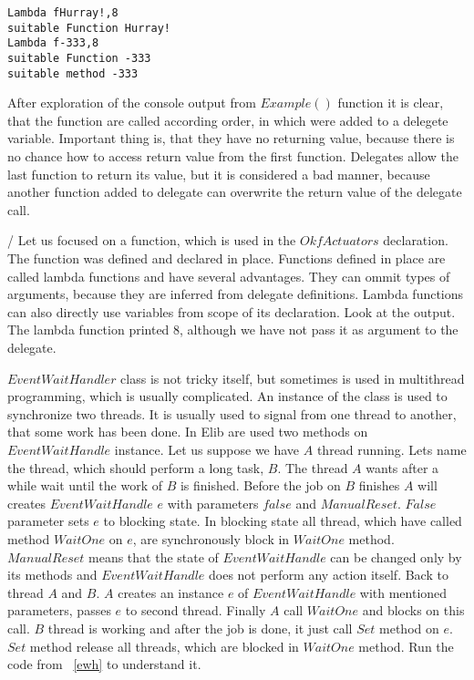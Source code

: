 \begin{verbatim}
Lambda fHurray!,8
suitable Function Hurray!
Lambda f-333,8
suitable Function -333
suitable method -333
\end{verbatim}

	After exploration of the console output from $Example()$ function it is clear, that the function are called according order, in
	which were added to a delegete variable. Important thing is, that they have no returning value, because there is no chance how to access
	return value from the first function. Delegates allow the last function to return its value, but it is considered a bad manner, because
	another function added to delegate can overwrite the return value of the delegate call.

/	Let us focused on a function, which is used in the $OkfActuators$ declaration. The function 
	was defined and declared in place. Functions defined in place are called lambda functions and have several advantages. 
	They can ommit types of arguments, because they are inferred from delegate definitions. Lambda functions
	can also directly use variables from scope of its declaration. Look at the output. The lambda function printed 8,
	although we have not pass it as argument to the delegate.

	$EventWaitHandler$ class is not tricky itself, but sometimes is used in multithread programming, which is usually complicated.
	An instance of the class is used to synchronize two threads. It is usually used to signal from one thread to another, that some work has been done.
	In Elib are used two methods on $EventWaitHandle$ instance.
	Let us suppose we have $A$ thread running. Lets name the thread, which should perform a long task, $B$. The thread $A$ wants after a while wait until the work of $B$ is finished.
	Before the job on $B$ finishes $A$ will creates $EventWaitHandle$ $e$ with parameters $false$ and $ManualReset$. 
	$False$ parameter sets $e$ to blocking state. In blocking state all thread, which have called method $WaitOne$ on $e$, are synchronously block in $WaitOne$ method. 
	$ManualReset$ means that the state of $EventWaitHandle$ can be changed only by its methods and
	$EventWaitHandle$ does not perform any action itself.
	Back to thread $A$ and $B$. $A$ creates an instance $e$ of $EventWaitHandle$ with mentioned parameters, passes $e$ to second thread. Finally $A$ call $WaitOne$ and blocks on this call.
	$B$ thread is working and after the job is done, it just call $Set$ method on $e$. $Set$ method release all threads, which are blocked in $WaitOne$ method.
	Run the code from ~\ref{ewh} to understand it.

